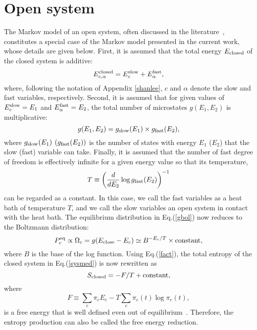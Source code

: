 \documentclass[aps,pre,amsmath,amssymb,floatfix,preprint,nofootinbib]{revtex4}
\begin{document}
\section{Open system}\label{open}
 The Markov model of an open system, often discussed in the literature~\cite{seif1,seif2,hg,gq,hs,sp}, constitutes a special case of the Markov model presented in the current work, whose details are given below.  First, it is assumed that the total energy $E_{\rm closed}$ of the closed system is additive:
\begin{equation}
E^{\rm closed}_{c,\alpha} = E^{\rm slow}_c + E^{\rm fast}_\alpha,
\end{equation}
where, following the notation of Appendix \ref{shanlee}, $c$ and $\alpha$ denote the slow and fast variables, respectively. 
Second, it is assumed that for given values of $E^{\rm slow}_c=E_1$ and $E^{\rm fast}_\alpha=E_2$, the total number of microstates $g(E_1,E_2)$ is multiplicative:
\begin{equation}
g(E_1, E_2) = g_{\rm slow}(E_1) \times g_{\rm fast}(E_2), 
\end{equation}
where $g_{\rm slow}(E_1)$ $(g_{\rm fast}(E_2))$ is the number of states with energy $E_1$ ($E_2$) that the slow (fast) variable can take. 
Finally, it is assumed that the number of fast degree of freedom is effectively infinite for a given energy value so that its temperature,
\begin{equation}
T \equiv \left(\frac{d} {d E_2} \log g_{\rm fast}(E_2)\right)^{-1}
\end{equation}
can be regarded as a constant. In this case, we call the fast variables as a heat bath of temperature $T$, and we call the slow variables an open system in contact with the heat bath. The equilibrium distribution in Eq.(\ref{gbol}) now reduces to the Boltzmann distribution:
\begin{equation}
P^{\rm eq}_c \propto \Omega_c =g( E_{\rm close}-E_c) \simeq B^{-E_c/T} \times {\rm constant}, \label{fact}
\end{equation} 
where $B$ is the base of the log function.
 Using Eq.(\ref{fact}), the total entropy of the closed system in Eq.(\ref{sysmed}) is now rewritten as
\begin{equation}
S_{\rm closed} = -F/T + {\rm constant}, \label{free2}
\end{equation}
where 
\begin{equation}
F \equiv \sum_c \pi_c E_c - T  \sum_c \pi_c(t) \log \pi_c(t), \label{free3} 
\end{equation} 
is a free energy that is well defined even out of equilibrium~\cite{gq,ne}. Therefore, the entropy production can also be called the free energy reduction. 
\end{document}
